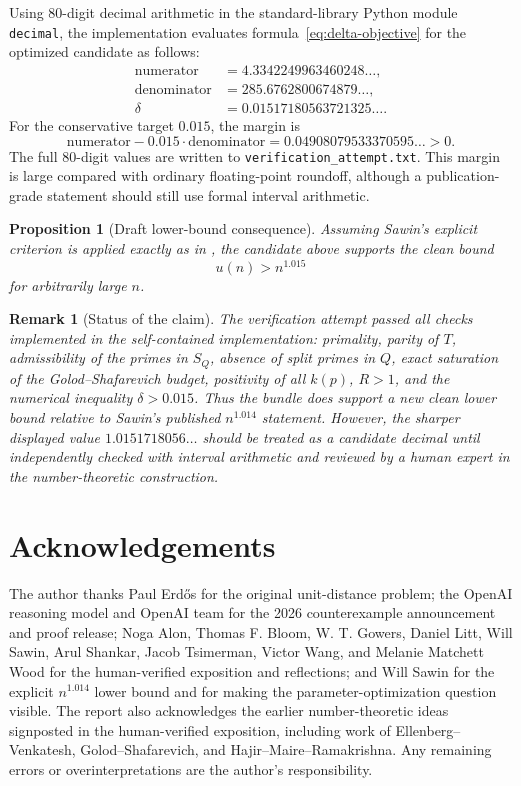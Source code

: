 \documentclass[a4paper,12pt]{article}
\newtheorem{remark}{Remark}
\newtheorem{proposition}{Proposition}
\begin{document}
Using 80-digit decimal arithmetic in the standard-library Python module \texttt{decimal}, the implementation evaluates formula~\eqref{eq:delta-objective} for the optimized candidate as follows:
\[
\begin{aligned}
\text{numerator}   &=4.3342249963460248\ldots,\\
\text{denominator} &=285.6762800674879\ldots,\\
\delta             &=0.01517180563721325\ldots .
\end{aligned}
\]
For the conservative target $0.015$, the margin is
\[
\text{numerator}-0.015\cdot \text{denominator}
=0.04908079533370595\ldots>0.
\]
The full 80-digit values are written to \texttt{verification\_attempt.txt}.
This margin is large compared with ordinary floating-point roundoff, although a publication-grade statement should still use formal interval arithmetic.

\begin{proposition}[Draft lower-bound consequence]
Assuming Sawin's explicit criterion is applied exactly as in \cite{Sawin2026}, the candidate above supports the clean bound
\[
  u(n)>n^{1.015}
\]
for arbitrarily large $n$.
\end{proposition}

\begin{remark}[Status of the claim]
The verification attempt passed all checks implemented in the self-contained implementation: primality, parity of $T$, admissibility of the primes in $S_Q$, absence of split primes in $Q$, exact saturation of the Golod--Shafarevich budget, positivity of all $k(p)$, $R>1$, and the numerical inequality $\delta>0.015$.  Thus the bundle does support a new clean lower bound relative to Sawin's published $n^{1.014}$ statement.  However, the sharper displayed value $1.0151718056\ldots$ should be treated as a candidate decimal until independently checked with interval arithmetic and reviewed by a human expert in the number-theoretic construction.
\end{remark}

\section*{Acknowledgements}

The author thanks Paul Erd\H{o}s for the original unit-distance problem; the OpenAI reasoning model and OpenAI team for the 2026 counterexample announcement and proof release; Noga Alon, Thomas F. Bloom, W. T. Gowers, Daniel Litt, Will Sawin, Arul Shankar, Jacob Tsimerman, Victor Wang, and Melanie Matchett Wood for the human-verified exposition and reflections; and Will Sawin for the explicit $n^{1.014}$ lower bound and for making the parameter-optimization question visible.  The report also acknowledges the earlier number-theoretic ideas signposted in the human-verified exposition, including work of Ellenberg--Venkatesh, Golod--Shafarevich, and Hajir--Maire--Ramakrishna.  Any remaining errors or overinterpretations are the author's responsibility.
\end{document}
